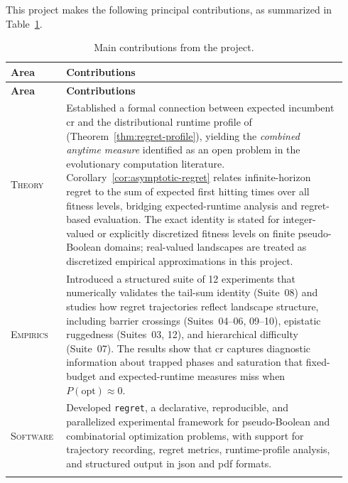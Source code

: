 This project makes the following principal contributions, as
summarized in Table~\ref{tab:contributions}.
\begin{longtable}{@{}p{0.15\linewidth}p{0.79\linewidth}@{}}

  \toprule
  \textbf{Area} & \textbf{Contributions} \\
  \midrule
  \endfirsthead

  \toprule
  \textbf{Area} & \textbf{Contributions} \\
  \midrule
  \endhead


  \textsc{Theory} &
  Established a formal connection between expected \gls{incumbent}
  \acrfull{cr} and
  the distributional runtime profile of~\citet{pinto2018practice}
  (Theorem~\ref{thm:regret-profile}), yielding the \textit{combined anytime
  measure} identified as an open problem in the evolutionary computation
  literature. Corollary~\ref{cor:asymptotic-regret} relates infinite-horizon
  regret to the sum of expected first hitting times over all fitness levels,
  bridging expected-runtime analysis and regret-based evaluation. The
  exact identity is stated for integer-valued or explicitly discretized fitness
  levels on finite pseudo-Boolean domains; real-valued landscapes are treated as
  discretized empirical approximations in this project. \\
  \hline

  \textsc{Empirics} &
  Introduced a structured suite of 12 experiments that numerically validates the
  tail-sum identity (Suite~08) and studies how regret trajectories reflect
  landscape structure, including barrier crossings (Suites~04--06, 09--10),
  epistatic ruggedness (Suites~03, 12), and hierarchical difficulty
  (Suite~07). The results show that \acrshort{cr} captures
  diagnostic information about trapped phases and saturation that
  fixed-budget and
  expected-runtime measures miss when $P(\mathrm{opt}) \approx 0$. \\
  \hline

  \textsc{Software} &
  Developed \texttt{regret}, a declarative, reproducible, and parallelized
  experimental framework for pseudo-Boolean and combinatorial optimization
  problems, with support for trajectory recording, regret metrics,
  runtime-profile
  analysis, and structured output in \acrshort{json} and
  \acrshort{pdf} formats. \\
  \hline

  \caption{Main contributions from the project.}
  \label{tab:contributions}
\end{longtable}

